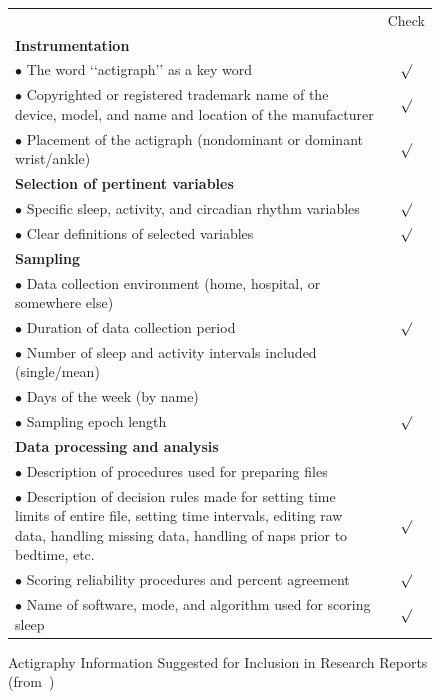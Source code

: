 \documentclass[a4paper,12pt]{article}
\newlength\savewidth
\newcommand\Ghline{%
	\noalign{\global\savewidth\arrayrulewidth\global\arrayrulewidth2pt}%
	\hline
	\noalign{\global\arrayrulewidth\savewidth}}
\begin{document}
\begin{figure}[H]
\centering
\begin{tabularx}{\textwidth}{|X|c|}
\hline
& Check \\
\Ghline
\textbf{Instrumentation} & \\
\hline
$\bullet$ The word ‘‘actigraph’’ as a key word & $\surd$\\
\hline
$\bullet$ Copyrighted or registered trademark name of the device, model, and name and location of the manufacturer &  $\surd$\\
\hline
$\bullet$ Placement of the actigraph (nondominant or dominant wrist/ankle) & $\surd$\\
\hline
\textbf{Selection of pertinent variables} & \\
\hline
$\bullet$ Specific sleep, activity, and circadian rhythm variables & $\surd$\\
\hline
$\bullet$ Clear definitions of selected variables & $\surd$\\
\hline
\textbf{Sampling} & \\
\hline
$\bullet$ Data collection environment (home, hospital, or somewhere else) & \\
\hline
$\bullet$ Duration of data collection period & $\surd$\\
\hline
$\bullet$ Number of sleep and activity intervals included (single/mean) & \\
\hline
$\bullet$ Days of the week (by name) & \\
\hline
$\bullet$ Sampling epoch length & $\surd$\\
\hline
\textbf{Data processing and analysis} & \\
\hline
$\bullet$ Description of procedures used for preparing files & \\
\hline
$\bullet$ Description of decision rules made for setting time limits of entire file, setting time intervals, editing raw data, handling missing data, handling of naps prior to bedtime, etc. & $\surd$ \\
\hline
$\bullet$ Scoring reliability procedures and percent agreement & $\surd$\\
\hline
$\bullet$ Name of software, mode, and algorithm used for scoring sleep & $\surd$\\
\hline
\end{tabularx}
\caption{Actigraphy Information Suggested for Inclusion in Research Reports (from~\cite{Berger2008})}
\label{checklistBerger}
\end{figure}
\end{document}
